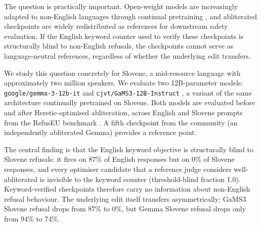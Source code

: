 \documentclass[11pt,letterpaper]{article}
\begin{document}
The question is practically important. Open-weight models are increasingly adapted to non-English languages through continual pretraining \citep{Vres2026}, and abliterated checkpoints are widely redistributed as references for downstream safety evaluation. If the English keyword counter used to verify these checkpoints is structurally blind to non-English refusals, the checkpoints cannot serve as language-neutral references, regardless of whether the underlying edit transfers.

We study this question concretely for Slovene, a mid-resource language with approximately two million speakers. We evaluate two 12B-parameter models: \texttt{google/gemma-3-12b-it} \citep{Kamath2025} and \texttt{cjvt/GaMS3-12B-Instruct} \citep{Vres2026}, a variant of the same architecture continually pretrained on Slovene. Both models are evaluated before and after Heretic-optimised abliteration, across English and Slovene prompts from the RefusEU benchmark \citep{Krasnodebska2026}. A fifth checkpoint from the community (an independently abliterated Gemma) provides a reference point.

The central finding is that the English keyword objective is structurally blind to Slovene refusals: it fires on 87\% of English responses but on 0\% of Slovene responses, and every optimiser candidate that a reference judge considers well-abliterated is invisible to the keyword counter (threshold-blind fraction 1.0). Keyword-verified checkpoints therefore carry no information about non-English refusal behaviour. The underlying edit itself transfers asymmetrically: GaMS3 Slovene refusal drops from 87\% to 0\%, but Gemma Slovene refusal drops only from 94\% to 74\%.
\end{document}
